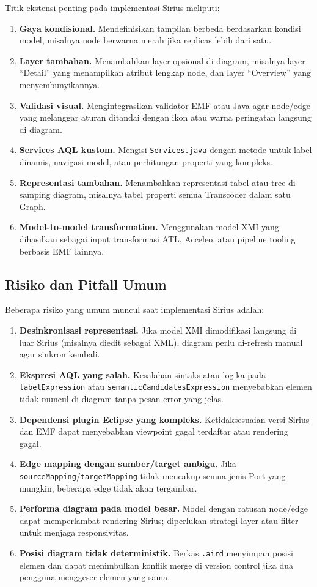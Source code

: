 Titik ekstensi penting pada implementasi Sirius meliputi:
\begin{enumerate}
  \item \textbf{Gaya kondisional.} Mendefinisikan tampilan berbeda berdasarkan kondisi model, misalnya node berwarna merah jika replicas lebih dari satu.
  \item \textbf{Layer tambahan.} Menambahkan layer opsional di diagram, misalnya layer ``Detail'' yang menampilkan atribut lengkap node, dan layer ``Overview'' yang menyembunyikannya.
  \item \textbf{Validasi visual.} Mengintegrasikan validator EMF atau Java agar node/edge yang melanggar aturan ditandai dengan ikon atau warna peringatan langsung di diagram.
  \item \textbf{Services AQL kustom.} Mengisi \texttt{Services.java} dengan metode untuk label dinamis, navigasi model, atau perhitungan properti yang kompleks.
  \item \textbf{Representasi tambahan.} Menambahkan representasi tabel atau tree di samping diagram, misalnya tabel properti semua Transcoder dalam satu Graph.
  \item \textbf{Model-to-model transformation.} Menggunakan model XMI yang dihasilkan sebagai input transformasi ATL, Acceleo, atau pipeline tooling berbasis EMF lainnya.
\end{enumerate}

\subsection{Risiko dan Pitfall Umum}

Beberapa risiko yang umum muncul saat implementasi Sirius adalah:
\begin{enumerate}
  \item \textbf{Desinkronisasi representasi.} Jika model XMI dimodifikasi langsung di luar Sirius (misalnya diedit sebagai XML), diagram perlu di-refresh manual agar sinkron kembali.
  \item \textbf{Ekspresi AQL yang salah.} Kesalahan sintaks atau logika pada \texttt{labelExpression} atau \texttt{semanticCandidatesExpression} menyebabkan elemen tidak muncul di diagram tanpa pesan error yang jelas.
  \item \textbf{Dependensi plugin Eclipse yang kompleks.} Ketidaksesuaian versi Sirius dan EMF dapat menyebabkan viewpoint gagal terdaftar atau rendering gagal.
  \item \textbf{Edge mapping dengan sumber/target ambigu.} Jika \texttt{sourceMapping}/\texttt{targetMapping} tidak mencakup semua jenis Port yang mungkin, beberapa edge tidak akan tergambar.
  \item \textbf{Performa diagram pada model besar.} Model dengan ratusan node/edge dapat memperlambat rendering Sirius; diperlukan strategi layer atau filter untuk menjaga responsivitas.
  \item \textbf{Posisi diagram tidak deterministik.} Berkas \texttt{.aird} menyimpan posisi elemen dan dapat menimbulkan konflik merge di version control jika dua pengguna menggeser elemen yang sama.
\end{enumerate}

